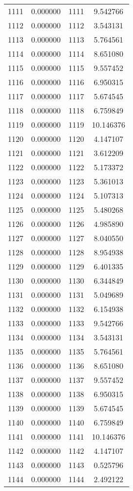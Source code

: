 \documentclass[12pt]{article}
\begin{document}
\begin{longtable}{@{}cccc@{}}
1111 & 0.000000 & 1111 & 9.542766 \\
1112 & 0.000000 & 1112 & 3.543131 \\
1113 & 0.000000 & 1113 & 5.764561 \\
1114 & 0.000000 & 1114 & 8.651080 \\
1115 & 0.000000 & 1115 & 9.557452 \\
1116 & 0.000000 & 1116 & 6.950315 \\
1117 & 0.000000 & 1117 & 5.674545 \\
1118 & 0.000000 & 1118 & 6.759849 \\
1119 & 0.000000 & 1119 & 10.146376 \\
1120 & 0.000000 & 1120 & 4.147107 \\
1121 & 0.000000 & 1121 & 3.612209 \\
1122 & 0.000000 & 1122 & 5.173372 \\
1123 & 0.000000 & 1123 & 5.361013 \\
1124 & 0.000000 & 1124 & 5.107313 \\
1125 & 0.000000 & 1125 & 5.480268 \\
1126 & 0.000000 & 1126 & 4.985890 \\
1127 & 0.000000 & 1127 & 8.040550 \\
1128 & 0.000000 & 1128 & 8.954938 \\
1129 & 0.000000 & 1129 & 6.401335 \\
1130 & 0.000000 & 1130 & 6.344849 \\
1131 & 0.000000 & 1131 & 5.049689 \\
1132 & 0.000000 & 1132 & 6.154938 \\
1133 & 0.000000 & 1133 & 9.542766 \\
1134 & 0.000000 & 1134 & 3.543131 \\
1135 & 0.000000 & 1135 & 5.764561 \\
1136 & 0.000000 & 1136 & 8.651080 \\
1137 & 0.000000 & 1137 & 9.557452 \\
1138 & 0.000000 & 1138 & 6.950315 \\
1139 & 0.000000 & 1139 & 5.674545 \\
1140 & 0.000000 & 1140 & 6.759849 \\
1141 & 0.000000 & 1141 & 10.146376 \\
1142 & 0.000000 & 1142 & 4.147107 \\
1143 & 0.000000 & 1143 & 0.525796 \\
1144 & 0.000000 & 1144 & 2.492122 \\

\end{longtable}
\end{document}
